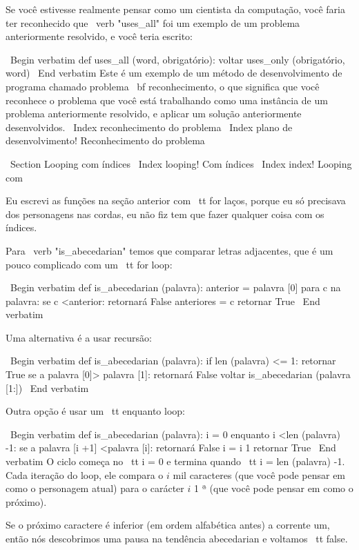 \documentclass[10pt]{book}
\begin{document}
\begin {itemize}
{{{{{{Se você estivesse realmente pensar como um cientista da computação, você faria
ter reconhecido que \ verb "uses_all" foi um exemplo de um
problema anteriormente resolvido, e você teria escrito:

\ Begin {verbatim}
def uses_all (word, obrigatório):
    voltar uses_only (obrigatório, word)
\ End {verbatim}
%
Este é um exemplo de um método de desenvolvimento de programa chamado problema {\ bf
reconhecimento}, o que significa que você reconhece o problema que você está
trabalhando como uma instância de um problema anteriormente resolvido, e aplicar um
solução anteriormente desenvolvidos.
\ Index {reconhecimento do problema}
\ Index {plano de desenvolvimento! Reconhecimento do problema}


\ Section {Looping com índices}
\ Index {looping! Com índices}
\ Index {index! Looping com}

Eu escrevi as funções na seção anterior com {\ tt for}
laços, porque eu só precisava dos personagens nas cordas, eu não fiz
tem que fazer qualquer coisa com os índices.

Para \ verb "is_abecedarian" temos que comparar letras adjacentes,
que é um pouco complicado com um {\ tt for} loop:

\ Begin {verbatim}
def is_abecedarian (palavra):
    anterior = palavra [0]
    para c na palavra:
        se c <anterior:
            retornará False
        anteriores = c
    retornar True
\ End {verbatim}


Uma alternativa é a
usar recursão:

\ Begin {verbatim}
def is_abecedarian (palavra):
    if len (palavra) <= 1:
        retornar True
    se a palavra [0]> palavra [1]:
        retornará False
    voltar is_abecedarian (palavra [1:])
\ End {verbatim}

Outra opção é usar um {\ tt enquanto} loop:

\ Begin {verbatim}
def is_abecedarian (palavra):
    i = 0
    enquanto i <len (palavra) -1:
        se a palavra [i +1] <palavra [i]:
            retornará False
        i = i 1
    retornar True
\ End {verbatim}
%
O ciclo começa no {\ tt i = 0} e termina quando {\ tt i = len (palavra) -1}. Cada
iteração do loop, ele compara o $ i $ mil caracteres (que você pode
pensar em como o personagem atual) para o carácter $ i $ 1 ª (que você
pode pensar em como o próximo).

Se o próximo caractere é inferior (em ordem alfabética antes) a corrente
um, então nós descobrimos uma pausa na tendência abecedarian e
voltamos {\ tt false}.

}}}}}}
\end{itemize}
\end{document}
